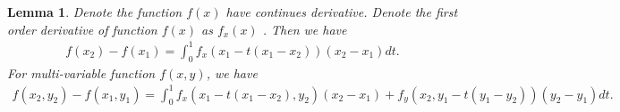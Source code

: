 \documentclass{article} %
\newcommand{\vmax}{V_{max}}
\newcommand{\bigspace}{\qquad\qquad}
\newtheorem{lemma}{Lemma}
\begin{document}


\begin{lemma} \label{lemma:hessian}
Denote the function $f(x)$ have continues  derivative. Denote the first   order derivative of function $f(x)$ as $f_x(x)$ . Then we have
\begin{align}
    f(x_2) - f(x_1) = \int_0^1 f_{x}(x_1- t(x_1-x_2))(x_2-x_1)dt.
\end{align}
For multi-variable function $f(x,y)$,  we have
\begin{align}
    f(x_2,y_2) - f(x_1,y_1) = \int_0^1 f_x(x_1 - t(x_1 - x_2), y_2)(x_2 - x_1) + f_y(x_2, y_1 - t(y_1- y_2))(y_2 - y_1)dt.
\end{align}
\end{lemma}
\end{document}
